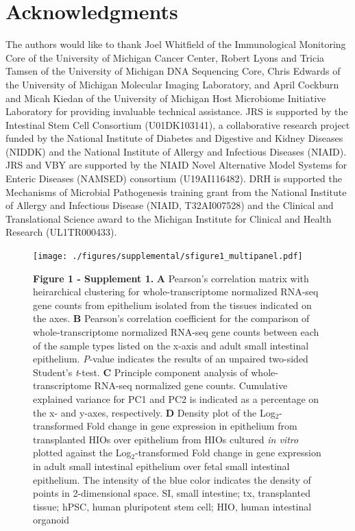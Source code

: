 \documentclass[9pt,lineo]{elife}
\begin{document}
\section*{{\bfseries\sffamily } Acknowledgments}
\label{sec:orgheadline28}
The authors would like to thank Joel Whitfield of the Immunological Monitoring Core of the University of Michigan Cancer Center, Robert Lyons and Tricia Tamsen of the University of Michigan DNA Sequencing Core, Chris Edwards of the University of Michigan Molecular Imaging Laboratory, and April Cockburn and Micah Kiedan of the University of Michigan Host Microbiome Initiative Laboratory for providing invaluable technical assistance.
JRS is supported by the Intestinal Stem Cell Consortium (U01DK103141), a collaborative research project funded by the National Institute of Diabetes and Digestive and Kidney Diseases (NIDDK) and the National Institute of Allergy and Infectious Diseases (NIAID). JRS and VBY are supported by the NIAID Novel Alternative Model Systems for Enteric Diseases (NAMSED) consortium (U19AI116482). DRH is supported the Mechanisms of Microbial Pathogenesis training grant from the National Institute of Allergy and Infectious Disease (NIAID, T32AI007528) and the Clinical and Translational Science award to the Michigan Institute for Clinical and Health Research (UL1TR000433). 

\nocite{*}
\begin{figure}
\begin{fullwidth}
\centering\texttt{[image: ./figures/supplemental/sfigure1\_multipanel.pdf]}
\caption*{\textbf{Figure 1 - Supplement 1. }\textbf{A} Pearson's correlation matrix with heirarchical clustering for whole-transcriptome normalized RNA-seq gene counts from epithelium isolated from the tissues indicated on the axes. \textbf{B} Pearson's correlation coefficient for the comparison of whole-transcriptome normalized RNA-seq gene counts between each of the sample types listed on the x-axis and adult small intestinal epithelium. \textit{P}-value indicates the results of an unpaired two-sided Student's \textit{t}-test. \textbf{C} Principle component analysis of whole-transcriptome RNA-seq normalized gene counts. Cumulative explained variance for PC1 and PC2 is indicated as a percentage on the x- and y-axes, respectively. \textbf{D} Density plot of the Log$_{2}$-transformed Fold change in gene expression in epithelium from transplanted HIOs over epithelium from HIOs cultured \textit{in vitro} plotted against the Log$_{2}$-transformed Fold change in gene expression in adult small intestinal epithelium over fetal small intestinal epithelium. The intensity of the blue color indicates the density of points in 2-dimensional space. SI, small intestine; tx, transplanted tissue; hPSC, human pluripotent stem cell; HIO, human intestinal organoid}
\label{fig:fullwidth}
\end{fullwidth}
\end{figure}
\end{document}
